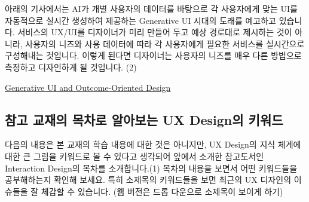 \documentclass[
  letterpaper,
  DIV=11,
  numbers=noendperiod]{scrreprt}
\begin{document}
아래의 기사에서는 AI가 개별 사용자의 데이터를 바탕으로 각 사용자에게
맞는 UI를 자동적으로 실시간 생성하여 제공하는 Generative UI 시대의
도래를 예고하고 있습니다. 서비스의 UX/UI를 디자이너가 미리 만들어 두고
예상 경로대로 제시하는 것이 아니라, 사용자의 니즈와 사용 데이터에 따라
각 사용자에게 필요한 서비스를 실시간으로 구성해내는 것입니다. 이렇게
된다면 디자이너는 사용자의 니즈를 매우 다른 방법으로 측정하고 디자인하게
될 것입니다. (2)

\href{https://www.nngroup.com/articles/generative-ui/}{Generative UI and
Outcome-Oriented Design}

\subsection{참고 교재의 목차로 알아보는 UX Design의
키워드}\label{uxcc38uxace0-uxad50uxc7acuxc758-uxbaa9uxcc28uxb85c-uxc54cuxc544uxbcf4uxb294-ux-designuxc758-uxd0a4uxc6ccuxb4dc}

다음의 내용은 본 교재의 학습 내용에 대한 것은 아니지만, UX Design의 지식
체계에 대한 큰 그림을 키워드로 볼 수 있다고 생각되어 앞에서 소개한
참고도서인 Interaction Design의 목차를 소개합니다.(1) 목차의 내용을
보면서 어떤 키워드들을 공부해하는지 확인해 보세요. 특히 소제목의
키워드들을 보면 최근의 UX 디자인의 이슈들을 잘 체감할 수 있습니다. (웹
버전은 드롭 다운으로 소제목이 보이게 하기)
\end{document}
